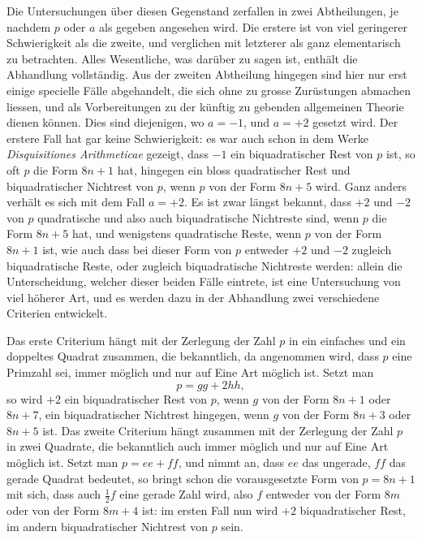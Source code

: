 \documentclass[12pt]{article}
\begin{document}
Die Untersuchungen über diesen Gegenstand zerfallen in zwei Abtheilungen, je nachdem $p$ oder $a$ als gegeben angesehen wird. Die erstere ist von viel geringerer Schwierigkeit als die zweite, und verglichen mit letzterer als ganz elementarisch zu betrachten. Alles Wesentliche, was darüber zu sagen ist, enthält die Abhandlung vollständig. Aus der zweiten Abtheilung hingegen sind hier nur erst einige specielle Fälle abgehandelt, die sich ohne zu grosse Zurüstungen abmachen liessen, und als Vorbereitungen zu der künftig zu gebenden allgemeinen Theorie dienen können. Dies sind diejenigen, wo $a=-1$, und $a=+2$ gesetzt wird. Der erstere Fall hat gar keine Schwierigkeit: es war auch schon in dem Werke \textit{Disquisitiones Arithmeticae} gezeigt, dass $-1$ ein biquadratischer Rest von $p$ ist, so oft $p$ die Form $8n+1$ hat, hingegen ein bloss quadratischer Rest und biquadratischer Nichtrest von $p$, wenn $p$ von der Form $8n+5$ wird. Ganz anders verhält es sich mit dem Fall $a=+2$. Es ist zwar längst bekannt, dass $+2$ und $-2$ von $p$ quadratische und also auch biquadratische Nichtreste sind, wenn $p$ die Form $8n+5$ hat, und wenigstens quadratische Reste, wenn $p$ von der Form $8n+1$ ist, wie auch dass bei dieser Form von $p$ entweder $+2$ und $-2$ zugleich biquadratische Reste, oder zugleich biquadratische Nichtreste werden: allein die Unterscheidung, welcher dieser beiden Fälle eintrete, ist eine Untersuchung von viel höherer Art, und es werden dazu in der Abhandlung zwei verschiedene Criterien entwickelt.

Das erste Criterium hängt mit der Zerlegung der Zahl $p$ in ein einfaches und ein doppeltes Quadrat zusammen, die bekanntlich, da angenommen wird, dass $p$ eine Primzahl sei, immer möglich und nur auf Eine Art möglich ist. Setzt man
\[
p=gg+2hh,
\]
so wird $+2$ ein biquadratischer Rest von $p$, wenn $g$ von der Form $8n+1$ oder $8n+7$, ein biquadratischer Nichtrest hingegen, wenn $g$ von der Form $8n+3$ oder $8n+5$ ist. Das zweite Criterium hängt zusammen mit der Zerlegung der Zahl $p$ in zwei Quadrate, die bekanntlich auch immer möglich und nur auf Eine Art möglich ist. Setzt man $p=ee+ff$, und nimmt an, dass $ee$ das ungerade, $ff$ das gerade Quadrat bedeutet, so bringt schon die vorausgesetzte Form von $p=8n+1$ mit sich, dass auch $\frac12f$ eine gerade Zahl wird, also $f$ entweder von der Form $8m$ oder von der Form $8m+4$ ist: im ersten Fall nun wird $+2$ biquadratischer Rest, im andern biquadratischer Nichtrest von $p$ sein.
\end{document}
